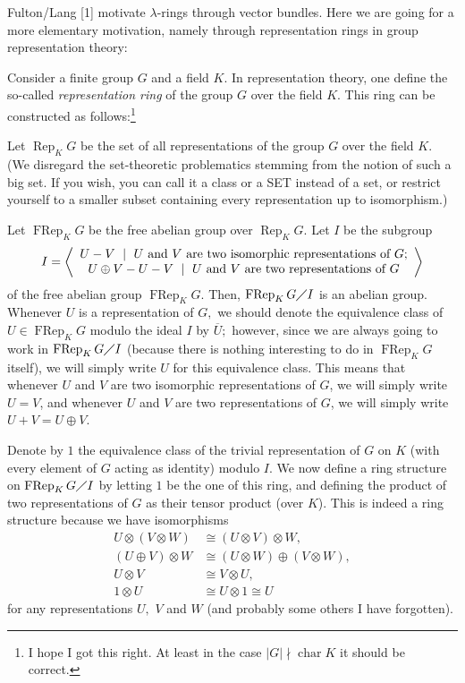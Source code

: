 \documentclass[12pt,final,notitlepage,onecolumn,german]{article}%
\begin{document}
Fulton/Lang [1] motivate $\lambda$-rings through vector bundles. Here we are
going for a more elementary motivation, namely through representation rings in
group representation theory:

Consider a finite group $G$ and a field $K$. In representation theory, one
define the so-called \textit{representation ring} of the group $G$ over the
field $K$. This ring can be constructed as follows:\footnote{I hope I got this
right. At least in the case $\left\vert G\right\vert \nmid\operatorname*{char}%
K$ it should be correct.}

Let $\operatorname*{Rep}_{K}G$ be the set of all representations of the group
$G$ over the field $K$. (We disregard the set-theoretic problematics stemming
from the notion of such a big set. If you wish, you can call it a class or a
SET instead of a set, or restrict yourself to a smaller subset containing
every representation up to isomorphism.)

Let $\operatorname*{FRep}_{K}G$ be the free abelian group over
$\operatorname*{Rep}_{K}G$. Let $I$ be the subgroup%
\[
I=\left\langle
\begin{array}
[c]{c}%
U-V\ \mid\ U\text{ and }V\text{ are two isomorphic representations of }G;\\
U\oplus V-U-V\ \mid\ U\text{ and }V\text{ are two representations of }G
\end{array}
\right\rangle
\]
of the free abelian group $\operatorname*{FRep}_{K}G$. Then,
$\operatorname*{FRep}_{K}G\diagup I$ is an abelian group. Whenever $U$ is a
representation of $G,$ we should denote the equivalence class of
$U\in\operatorname*{FRep}_{K}G$ modulo the ideal $I$ by $\overline{U};$
however, since we are always going to work in $\operatorname*{FRep}%
_{K}G\diagup I$ (because there is nothing interesting to do in
$\operatorname*{FRep}_{K}G$ itself), we will simply write $U$ for this
equivalence class. This means that whenever $U$ and $V$ are two isomorphic
representations of $G$, we will simply write $U=V$, and whenever $U$ and $V$
are two representations of $G$, we will simply write $U+V=U\oplus V$.

Denote by $1$ the equivalence class of the trivial representation of $G$ on
$K$ (with every element of $G$ acting as identity) modulo $I$. We now define a
ring structure on $\operatorname*{FRep}_{K}G\diagup I$ by letting $1$ be the
one of this ring, and defining the product of two representations of $G$ as
their tensor product (over $K$). This is indeed a ring structure because we
have isomorphisms%
\begin{align*}
U\otimes\left(  V\otimes W\right)   &  \cong\left(  U\otimes V\right)  \otimes
W,\\
\left(  U\oplus V\right)  \otimes W  &  \cong\left(  U\otimes W\right)
\oplus\left(  V\otimes W\right)  ,\\
U\otimes V  &  \cong V\otimes U,\\
1\otimes U  &  \cong U\otimes1\cong U
\end{align*}
for any representations $U,$ $V$ and $W$ (and probably some others I have forgotten).
\end{document}
